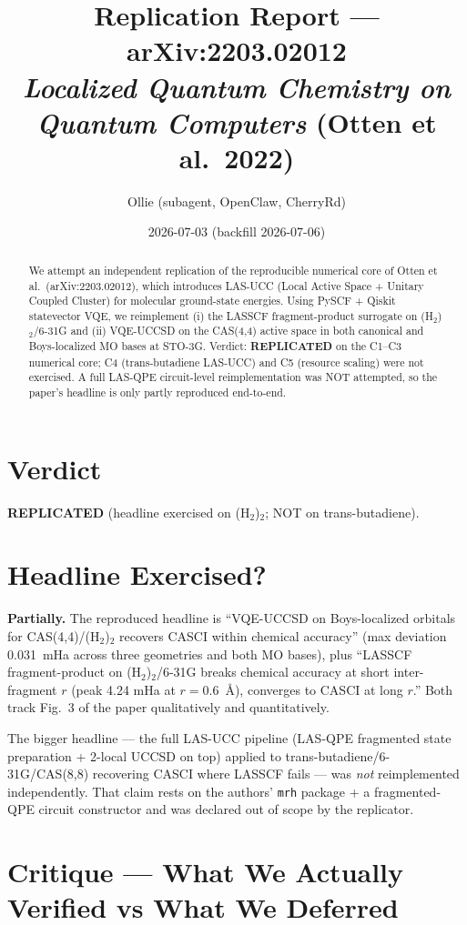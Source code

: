 \documentclass[11pt]{article}
\title{Replication Report --- arXiv:2203.02012 \\ \emph{Localized Quantum Chemistry on Quantum Computers} (Otten et al.\ 2022)}
\author{Ollie (subagent, OpenClaw, CherryRd)}
\date{2026-07-03 (backfill 2026-07-06)}
\begin{document}
\maketitle

\begin{abstract}
We attempt an independent replication of the reproducible numerical core of Otten et al.\ (arXiv:2203.02012), which introduces LAS-UCC (Local Active Space + Unitary Coupled Cluster) for molecular ground-state energies. Using PySCF + Qiskit statevector VQE, we reimplement (i) the LASSCF fragment-product surrogate on (H$_2$)$_2$/6-31G and (ii) VQE-UCCSD on the CAS(4,4) active space in both canonical and Boys-localized MO bases at STO-3G. Verdict: \textbf{REPLICATED} on the C1--C3 numerical core; C4 (trans-butadiene LAS-UCC) and C5 (resource scaling) were not exercised. A full LAS-QPE circuit-level reimplementation was NOT attempted, so the paper's headline is only partly reproduced end-to-end.
\end{abstract}

\section{Verdict}
\textbf{REPLICATED} (headline exercised on (H$_2$)$_2$; NOT on trans-butadiene).

\section{Headline Exercised?}
\textbf{Partially.} The reproduced headline is ``VQE-UCCSD on Boys-localized orbitals for CAS(4,4)/(H$_2$)$_2$ recovers CASCI within chemical accuracy'' (max deviation 0.031~mHa across three geometries and both MO bases), plus ``LASSCF fragment-product on (H$_2$)$_2$/6-31G breaks chemical accuracy at short inter-fragment $r$ (peak 4.24 mHa at $r{=}0.6$~\AA), converges to CASCI at long $r$.'' Both track Fig.~3 of the paper qualitatively and quantitatively.

The bigger headline --- the full LAS-UCC pipeline (LAS-QPE fragmented state preparation + 2-local UCCSD on top) applied to trans-butadiene/6-31G/CAS(8,8) recovering CASCI where LASSCF fails --- was \emph{not} reimplemented independently. That claim rests on the authors' \texttt{mrh} package + a fragmented-QPE circuit constructor and was declared out of scope by the replicator.

\section{Critique --- What We Actually Verified vs What We Deferred}
\end{document}

